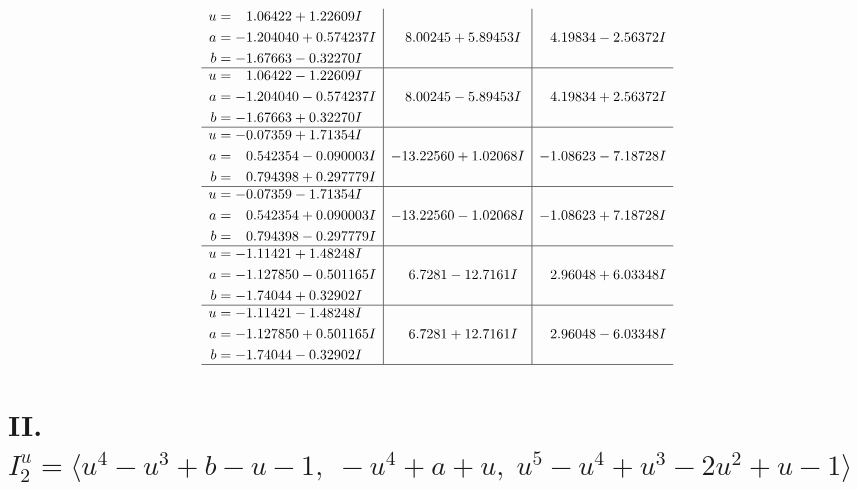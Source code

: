 \documentclass[1p]{elsarticle_modified}
\theoremstyle{definition}
\begin{document}
$$\begin{array}{c|c|c}
\begin{aligned}
u &= \phantom{-}1.06422 + 1.22609 I \\
a &= -1.204040 + 0.574237 I \\
b &= -1.67663 - 0.32270 I\end{aligned}
 & \phantom{-}8.00245 + 5.89453 I & \phantom{-}4.19834 - 2.56372 I \\ \hline\begin{aligned}
u &= \phantom{-}1.06422 - 1.22609 I \\
a &= -1.204040 - 0.574237 I \\
b &= -1.67663 + 0.32270 I\end{aligned}
 & \phantom{-}8.00245 - 5.89453 I & \phantom{-}4.19834 + 2.56372 I \\ \hline\begin{aligned}
u &= -0.07359 + 1.71354 I \\
a &= \phantom{-}0.542354 - 0.090003 I \\
b &= \phantom{-}0.794398 + 0.297779 I\end{aligned}
 & -13.22560 + 1.02068 I & -1.08623 - 7.18728 I \\ \hline\begin{aligned}
u &= -0.07359 - 1.71354 I \\
a &= \phantom{-}0.542354 + 0.090003 I \\
b &= \phantom{-}0.794398 - 0.297779 I\end{aligned}
 & -13.22560 - 1.02068 I & -1.08623 + 7.18728 I \\ \hline\begin{aligned}
u &= -1.11421 + 1.48248 I \\
a &= -1.127850 - 0.501165 I \\
b &= -1.74044 + 0.32902 I\end{aligned}
 & \phantom{-}6.7281 - 12.7161 I & \phantom{-}2.96048 + 6.03348 I \\ \hline\begin{aligned}
u &= -1.11421 - 1.48248 I \\
a &= -1.127850 + 0.501165 I \\
b &= -1.74044 - 0.32902 I\end{aligned}
 & \phantom{-}6.7281 + 12.7161 I & \phantom{-}2.96048 - 6.03348 I\\
 \hline 
 \end{array}$$\newpage\newpage\renewcommand{\arraystretch}{1}
\centering \section*{II. $I^u_{2}= \langle u^4- u^3+b- u-1,\;- u^4+a+u,\;u^5- u^4+u^3-2 u^2+u-1 \rangle$}
\end{document}

